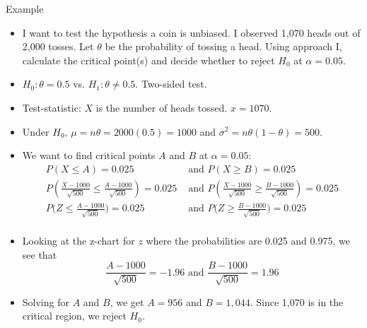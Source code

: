 \documentclass[10pt, handout, xcolor=table]{beamer}
\begin{document}
\begin{frame}{Example}
\begin{itemize}
\setlength{\itemsep}{5pt}
\item I want to test the hypothesis a coin is unbiased. I observed 1,070 heads out of 2,000 tosses. Let $\theta$ be the probability of tossing a head. Using approach I, calculate the critical point(s) and decide whether to reject $H_0$ at $\alpha = 0.05$.
\footnotesize
\item<2->[Ans:] \color{red} $H_0: \theta = 0.5$ vs. $H_1: \theta \neq 0.5$. Two-sided test.
\item<2->[] \color{red} Test-statistic: $X$ is the number of heads tossed. $x = 1070$.
\item<2->[] \color{red} Under $H_0$, $\mu = n\theta = 2000(0.5) = 1000$ and $\sigma^2 = n\theta(1-\theta) = 500$.
\item<2->[] \color{red} We want to find critical points $A$ and $B$ at $\alpha = 0.05$:
\begin{align*}
P(X \leq A) = 0.025 &\text{ and } P(X \geq B) = 0.025\\
P\left(\frac{X - 1000}{\sqrt{500}} \leq \frac{A - 1000}{\sqrt{500}}\right) =0.025 &\text{ and } P\left(\frac{X - 1000}{\sqrt{500}} \geq \frac{B - 1000}{\sqrt{500}} \right)=0.025 \\
P\bigg(Z \leq \frac{A - 1000}{\sqrt{500}}\bigg) = 0.025  &\text{ and } P\bigg(Z\geq \frac{B - 1000}{\sqrt{500}}\bigg) = 0.025\\
\end{align*}
\vspace*{-7ex}
\item<2->[] \color{red} Looking at the z-chart for $z$ where the probabilities are 0.025 and 0.975, we see that
\[
\frac{A-1000}{\sqrt{500}} = -1.96 \text{ and } \frac{B - 1000}{\sqrt{500}} = 1.96
\]
\item<2->[] \color{red} Solving for $A$ and $B$, we get $A = 956$ and $B = 1,044$. Since 1,070 is in the critical region, we reject $H_0$.
\end{itemize}
\end{frame}
\end{document}
